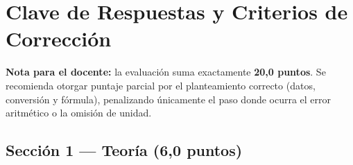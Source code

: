 \documentclass[12pt, letterpaper]{article}
\begin{document}
\ifmwclaves
\newpage
\section{Clave de Respuestas y Criterios de Corrección}

\begin{cuadroinfo}
  \small
  \textbf{Nota para el docente:} la evaluación suma exactamente \textbf{20,0 puntos}.
  Se recomienda otorgar puntaje parcial por el planteamiento correcto (datos, conversión
  y fórmula), penalizando únicamente el paso donde ocurra el error aritmético o la omisión de unidad.
\end{cuadroinfo}

\subsection*{Sección 1 — Teoría (6,0 puntos)}
\end{document}
